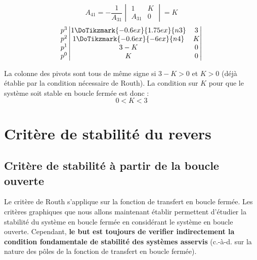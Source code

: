 \[
A_{41}=-\dfrac{1}{A_{31}}\begin{vmatrix} 1 & K \\ A_{31} & 0 \end{vmatrix}=K
\]
\[
\begin{matrix}
    p^3 \\
    p^2 \\
    p^1 \\
    p^0 \\
\end{matrix}
\begin{vmatrix}
    1\DoTikzmark{-0.6ex}{1.75ex}{n3}   & 3  \\
    1\DoTikzmark{-0.6ex}{-6ex}{n4}     & K  \\
    3-K                      & 0  \\
    K                        & 0    
    \end{vmatrix}
\]

La colonne des pivots sont tous de même signe si $3-K>0$ et $K>0$ (déjà établie 
par la condition nécessaire de Routh). La condition sur $K$ pour que le 
système soit stable en boucle fermée est donc :
\[
    0<K<3
\]
\clearpage
\section{Critère de stabilité du revers}
\subsection{Critère de stabilité à partir de la boucle ouverte}
Le critère de Routh s'applique sur la fonction de transfert en boucle fermée.
Les critères graphiques que nous allons maintenant établir 
permettent d'étudier la stabilité du système en boucle fermée en considérant 
le système en boucle ouverte. Cependant, \textbf{le but est toujours de verifier
indirectement la condition fondamentale de stabilité des systèmes asservis}
(c.-à-d. sur la nature des pôles de la fonction de transfert en boucle fermée).

